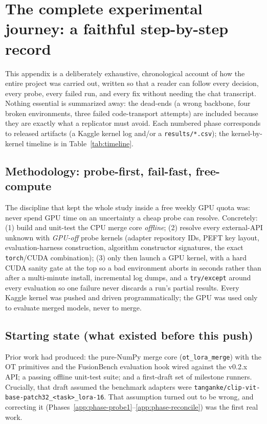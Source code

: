 \section{The complete experimental journey: a faithful step-by-step record}
\label{app:journey}
This appendix is a deliberately exhaustive, chronological account of how the entire project was carried
out, written so that a reader can follow every decision, every probe, every failed run, and every fix
without needing the chat transcript. Nothing essential is summarized away: the dead-ends (a wrong
backbone, four broken environments, three failed code-transport attempts) are included because they are
exactly what a replicator must avoid. Each numbered phase corresponds to released artifacts (a Kaggle
kernel log and/or a \texttt{results/*.csv}); the kernel-by-kernel timeline is in
Table~\ref{tab:timeline}.

\subsection{Methodology: probe-first, fail-fast, free-compute}
\label{app:method-meta}
The discipline that kept the whole study inside a free weekly GPU quota was: never spend GPU time on an
uncertainty a cheap probe can resolve. Concretely: (1) build and unit-test the CPU merge core
\emph{offline}; (2) resolve every external-API unknown with \emph{GPU-off} probe kernels (adapter
repository IDs, PEFT key layout, evaluation-harness construction, algorithm constructor signatures, the
exact \texttt{torch}/CUDA combination); (3) only then launch a GPU kernel, with a hard CUDA sanity gate at
the top so a bad environment aborts in seconds rather than after a multi-minute install, incremental log
dumps, and a \texttt{try/except} around every evaluation so one failure never discards a run's partial
results. Every Kaggle kernel was pushed and driven programmatically; the GPU was used only to evaluate
merged models, never to merge.

\subsection{Starting state (what existed before this push)}
Prior work had produced: the pure-NumPy merge core (\texttt{ot\_lora\_merge}) with the OT primitives and
the FusionBench evaluation hook wired against the v0.2.x API; a passing offline unit-test suite; and a
first-draft set of milestone runners. Crucially, that draft assumed the benchmark adapters were
\texttt{tanganke/clip-vit-base-patch32\_<task>\_lora-16}. That assumption turned out to be wrong, and
correcting it (Phases~\ref{app:phase-probe1}--\ref{app:phase-reconcile}) was the first real work.

